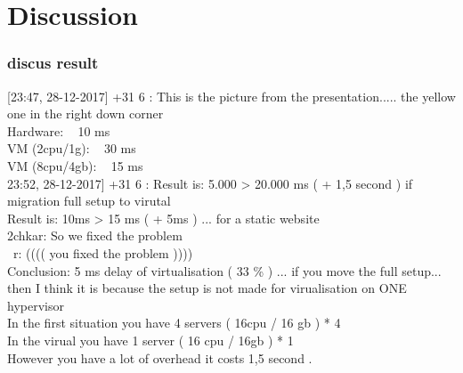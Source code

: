 \section{Discussion}
\paragraph{}













\subsubsection{discus result}

[23:47, 28-12-2017] +31 6 : This is the picture from the presentation..... the yellow one in the right down corner\\
Hardware: ~ 10 ms\\
VM (2cpu/1g): ~ 30 ms\\
VM (8cpu/4gb): ~ 15 ms\\
23:52, 28-12-2017] +31 6 : Result is: 5.000 > 20.000 ms ( + 1,5 second )  if migration full setup to virutal\\
Result is:  10ms > 15 ms ( + 5ms )   ... for a static website\\
2chkar: So we fixed the problem\\\
r: (((( you fixed the problem ))))\\
Conclusion:   5 ms delay of virtualisation ( 33 \% ) ... if you move the full setup... then %
I think it is because the setup is not made for virualisation on ONE hypervisor\\
In the first situation you have 4 servers ( 16cpu / 16 gb ) * 4\\
In the virual you have 1 server ( 16 cpu / 16gb ) * 1\\
However you have a lot of overhead it costs 1,5 second .\\